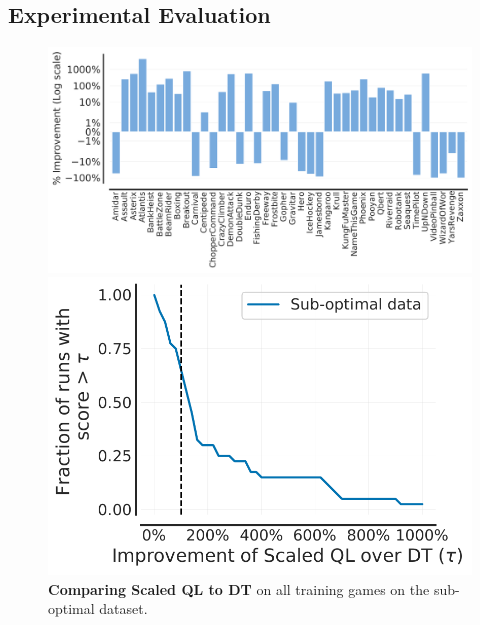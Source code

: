\vspace{-0.2cm}
\subsection{Experimental Evaluation}
\label{sec:exps}
\vspace{-0.2cm}

\begin{figure}[t]
    \centering
    \begin{minipage}{0.65\linewidth}
 \includegraphics[width=\linewidth]{chapters/scaled_ql/figures/percent_improvement_over_DT.pdf}
    \end{minipage}
    \hfill
    \begin{minipage}{0.34\linewidth}
    \vspace{-0.2cm}
 \includegraphics[width=\linewidth]{chapters/scaled_ql/figures/pp_profile_ql_dt.pdf}
    \end{minipage}
    \vspace{-0.4cm}
    \caption{\textbf{Comparing Scaled QL to DT} on all training games on the sub-optimal dataset.}
    \label{fig:percent_improvement}
    \vspace{-0.5cm}
\end{figure}

